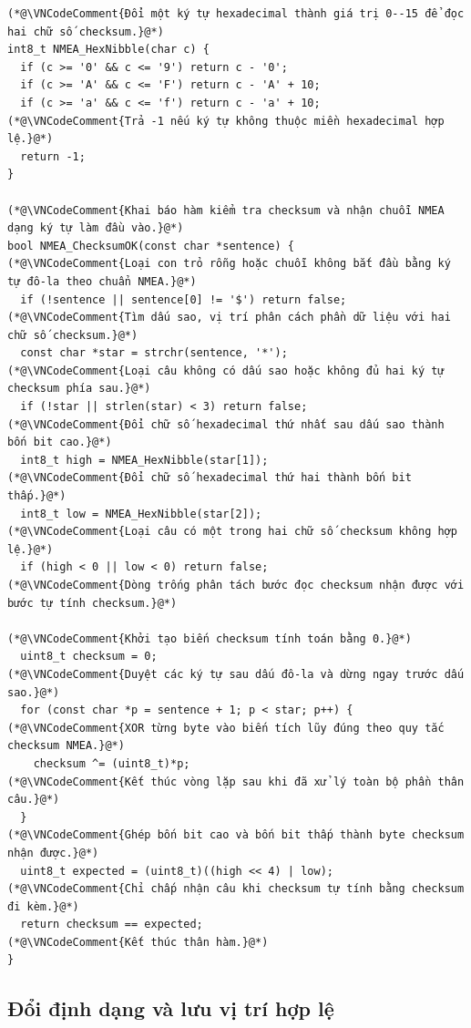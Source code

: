 \documentclass[12pt]{article}
\begin{document}
\Needspace{0.34\textheight}
\begin{lstlisting}[style=firmware,caption={Tính và kiểm tra checksum NMEA trước khi tách trường}]
(*@\VNCodeComment{Đổi một ký tự hexadecimal thành giá trị 0--15 để đọc hai chữ số checksum.}@*)
int8_t NMEA_HexNibble(char c) {
  if (c >= '0' && c <= '9') return c - '0';
  if (c >= 'A' && c <= 'F') return c - 'A' + 10;
  if (c >= 'a' && c <= 'f') return c - 'a' + 10;
(*@\VNCodeComment{Trả -1 nếu ký tự không thuộc miền hexadecimal hợp lệ.}@*)
  return -1;
}

(*@\VNCodeComment{Khai báo hàm kiểm tra checksum và nhận chuỗi NMEA dạng ký tự làm đầu vào.}@*)
bool NMEA_ChecksumOK(const char *sentence) {
(*@\VNCodeComment{Loại con trỏ rỗng hoặc chuỗi không bắt đầu bằng ký tự đô-la theo chuẩn NMEA.}@*)
  if (!sentence || sentence[0] != '$') return false;
(*@\VNCodeComment{Tìm dấu sao, vị trí phân cách phần dữ liệu với hai chữ số checksum.}@*)
  const char *star = strchr(sentence, '*');
(*@\VNCodeComment{Loại câu không có dấu sao hoặc không đủ hai ký tự checksum phía sau.}@*)
  if (!star || strlen(star) < 3) return false;
(*@\VNCodeComment{Đổi chữ số hexadecimal thứ nhất sau dấu sao thành bốn bit cao.}@*)
  int8_t high = NMEA_HexNibble(star[1]);
(*@\VNCodeComment{Đổi chữ số hexadecimal thứ hai thành bốn bit thấp.}@*)
  int8_t low = NMEA_HexNibble(star[2]);
(*@\VNCodeComment{Loại câu có một trong hai chữ số checksum không hợp lệ.}@*)
  if (high < 0 || low < 0) return false;
(*@\VNCodeComment{Dòng trống phân tách bước đọc checksum nhận được với bước tự tính checksum.}@*)

(*@\VNCodeComment{Khởi tạo biến checksum tính toán bằng 0.}@*)
  uint8_t checksum = 0;
(*@\VNCodeComment{Duyệt các ký tự sau dấu đô-la và dừng ngay trước dấu sao.}@*)
  for (const char *p = sentence + 1; p < star; p++) {
(*@\VNCodeComment{XOR từng byte vào biến tích lũy đúng theo quy tắc checksum NMEA.}@*)
    checksum ^= (uint8_t)*p;
(*@\VNCodeComment{Kết thúc vòng lặp sau khi đã xử lý toàn bộ phần thân câu.}@*)
  }
(*@\VNCodeComment{Ghép bốn bit cao và bốn bit thấp thành byte checksum nhận được.}@*)
  uint8_t expected = (uint8_t)((high << 4) | low);
(*@\VNCodeComment{Chỉ chấp nhận câu khi checksum tự tính bằng checksum đi kèm.}@*)
  return checksum == expected;
(*@\VNCodeComment{Kết thúc thân hàm.}@*)
}
\end{lstlisting}

\subsection{Đổi định dạng và lưu vị trí hợp lệ}
\end{document}
